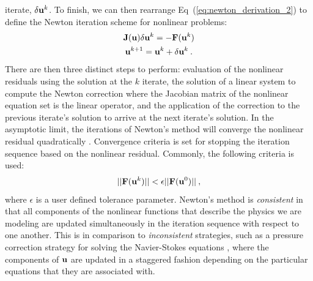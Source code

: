 iterate, $\delta \mathbf{u}^k$. To finish, we can then rearrange
Eq~(\ref{eq:newton_derivation_2}) to define the Newton iteration
scheme for nonlinear problems:
\begin{subequations}
  \begin{gather}
    \mathbf{J}(\mathbf{u}) \delta \mathbf{u}^k = -\mathbf{F}(\mathbf{u}^{k})\\
    \mathbf{u}^{k+1} = \mathbf{u}^k + \delta \mathbf{u}^k\:.
  \end{gather}
  \label{eq:newton_iteration}
\end{subequations}
There are then three distinct steps to perform: evaluation of the
nonlinear residuals using the solution at the $k$ iterate, the
solution of a linear system to compute the Newton correction where the
Jacobian matrix of the nonlinear equation set is the linear operator,
and the application of the correction to the previous iterate's
solution to arrive at the next iterate's solution. In the asymptotic
limit, the iterations of Newton's method will converge the nonlinear
residual quadratically \citep{kelley_iterative_1995}. Convergence
criteria is set for stopping the iteration sequence based on the
nonlinear residual. Commonly, the following criteria is used:
\begin{equation}
  ||\mathbf{F}(\mathbf{u}^{k})|| < \epsilon ||\mathbf{F}(\mathbf{u}^{0})||\:,
  \label{eq:newton_stopping_criteria}
\end{equation}
where $\epsilon$ is a user defined tolerance parameter. Newton's
method is \textit{consistent} in that all components of the nonlinear
functions that describe the physics we are modeling are updated
simultaneously in the iteration sequence with respect to one
another. This is in comparison to \textit{inconsistent} strategies,
such as a pressure correction strategy for solving the Navier-Stokes
equations \citep{pletcher_computational_1997}, where the components of
$\mathbf{u}$ are updated in a staggered fashion depending on the
particular equations that they are associated with.

